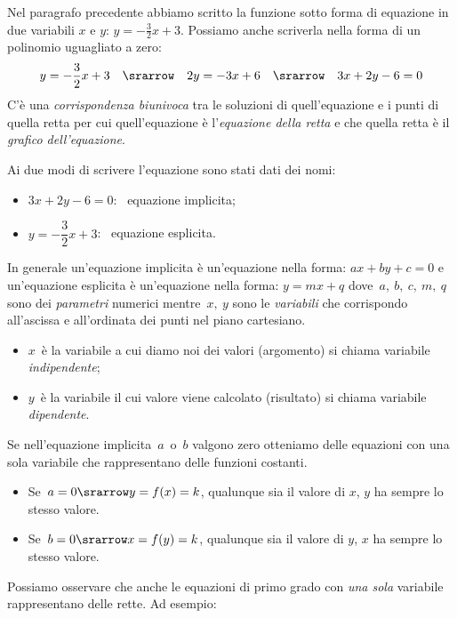 Nel paragrafo precedente abbiamo scritto la funzione sotto forma di 
equazione in due variabili \(x\) e \(y\): \(y=-\frac{3}{2}x+3\).
Possiamo anche scriverla 
nella forma di un polinomio uguagliato a zero:
\[y=-\frac{3}{2}x+3 \quad \srarrow \quad 2y = -3x +6 \quad \srarrow \quad 
  3x +2y -6 = 0\]
C'è una \emph{corrispondenza biunivoca} tra le 
soluzioni di quell'equazione e i punti di quella retta per cui  
quell'equazione è l'\emph{equazione della retta} e che quella retta è il 
\emph{grafico dell'equazione}.

Ai due modi di scrivere l'equazione sono stati dati dei nomi:

\begin{multicols}{2}
\begin{itemize} [nosep]
 \item \(3x + 2y - 6 = 0\):~ equazione implicita;
 \item \(y = -\dfrac{3}{2}x +3\):~ equazione esplicita.
\end{itemize}
\end{multicols}

In generale un'equazione implicita è un'equazione nella forma: \quad
\(ax + by + c = 0\)
e un'equazione esplicita è un'equazione nella forma: \quad
\(y = mx + q\)
dove~\(a,~b,~c,~m,~q\) sono dei \emph{parametri} numerici mentre~\(x,~y\) 
sono le \emph{variabili} che corrispondo all'ascissa e all'ordinata dei punti 
nel piano cartesiano.

\begin{itemize} [noitemsep]
 \item \(x\)~è la variabile a cui diamo noi dei valori (argomento) si chiama 
  variabile \emph{indipendente};
 \item \(y\)~è la variabile il cui valore viene calcolato (risultato) si 
chiama variabile \emph{dipendente}.
\end{itemize}

Se nell'equazione implicita~\(a\)~o~\(b\) valgono zero otteniamo delle 
equazioni con una sola variabile che rappresentano delle funzioni costanti.
\begin{itemize} [noitemsep]
\item 
Se~\(a=0 \srarrow y=f(x)=k\), qualunque sia 
il valore di \(x\), \(y\) ha sempre lo stesso valore.
\item 
Se~\(b=0 \srarrow x=f(y)=k\), qualunque sia 
il valore di \(y\), \(x\) ha sempre lo stesso valore.
\end{itemize}

Possiamo osservare che anche le equazioni di primo grado con 
\emph{una sola} variabile rappresentano delle rette. Ad esempio:

